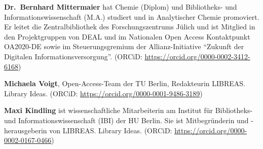 \documentclass[a4paper,
fontsize=11pt,
oneside,
numbers=noperiodatend,
parskip=half-,
bibliography=totoc,
final
]{scrartcl}
\begin{document}
\textbf{Dr.~Bernhard Mittermaier} hat Chemie (Diplom) und Bibliotheks-
und Informationswissenschaft (M.A.) studiert und in Analytischer Chemie
promoviert. Er leitet die Zentralbibliothek des Forschungszentrums
Jülich und ist Mitglied in den Projektgruppen von DEAL und im Nationalen
Open Access Kontaktpunkt OA2020-DE sowie im Steuerungsgremium der
Allianz-Initiative ``Zukunft der Digitalen Informationsversorgung''.
(ORCiD: \url{https://orcid.org/0000-0002-3412-6168})

\textbf{Michaela Voigt}, Open-Access-Team der TU Berlin, Redakteurin
LIBREAS. Library Ideas. (ORCiD:
\url{https://orcid.org/0000-0001-9486-3189})

\textbf{Maxi Kindling} ist wissenschaftliche Mitarbeiterin am Institut
für Bibliotheks- und Informationswissenschaft (IBI) der HU Berlin. Sie
ist Mitbegründerin und -herausgeberin von LIBREAS. Library Ideas.
(ORCiD: \url{https://orcid.org/0000-0002-0167-0466})
\end{document}
